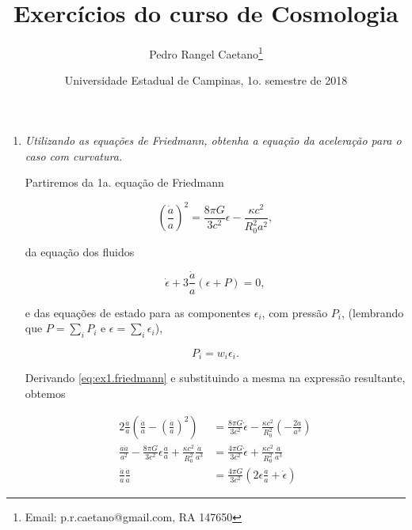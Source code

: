 \documentclass[a4paper, 12pt, notitlepage]{article}
\begin{document}
\title{Exercícios do curso de Cosmologia}
\author{Pedro Rangel Caetano\footnote{Email: p.r.caetano@gmail.com, RA 147650}} 
\date{Universidade Estadual de Campinas, 1o. semestre de 2018}
\maketitle

\begin{enumerate}

\item \textit{Utilizando as equações de Friedmann, obtenha a equação da aceleração para o caso com curvatura.}
\vspace{1cm}

Partiremos da 1a. equação de Friedmann

\begin{equation}
\label{eq:ex1.friedmann}
  \left(\frac{\dot{a}}{a}\right)^2 = \frac{8\pi G}{3c^2} \epsilon - \frac{\kappa c^2}{R_0^2 a^2},
\end{equation}

\noindent da equação dos fluidos

\begin{equation}
\label{eq:ex1.fluid}
  \dot{\epsilon} + 3 \frac{\dot{a}}{a}\left(\epsilon + P\right) = 0,
\end{equation}

\noindent e das equações de estado para as componentes $\epsilon_i$, com pressão $P_i$, (lembrando que $P = \sum_i P_i$ e $\epsilon = \sum_i \epsilon_i$),

\begin{equation}
\label{eq:ex1.eos}
  P_i = w_i \epsilon_i.
\end{equation}

Derivando \eqref{eq:ex1.friedmann} e substituindo a mesma na expressão resultante, obtemos

\begin{align*}
  2\frac{\dot{a}}{a}\left(\frac{\ddot{a}}{a} - \left(\frac{\dot{a}}{a}\right)^2\right) &= \frac{8\pi G}{3c^2} \dot{\epsilon} - \frac{\kappa c^2}{R_0^2}\left(-\frac{2\dot{a}}{a^3}\right) \\
  \frac{\dot{a}\ddot{a}}{a^2} - \frac{8\pi G}{3c^2}\epsilon\frac{\dot{a}}{a} + \frac{\kappa c^2}{R_0^2}\frac{\dot{a}}{a^3} &= \frac{4\pi G}{3c^2} \dot{\epsilon} + \frac{\kappa c^2}{R_0^2} \frac{\dot{a}}{a^3} \\
  \frac{\ddot{a}}{a} \frac{\dot{a}}{a} &= \frac{4\pi G}{3c^2}\left(2\epsilon \frac{\dot{a}}{a} + \dot{\epsilon}\right)
\end{align*}


\end{enumerate}
\end{document}
